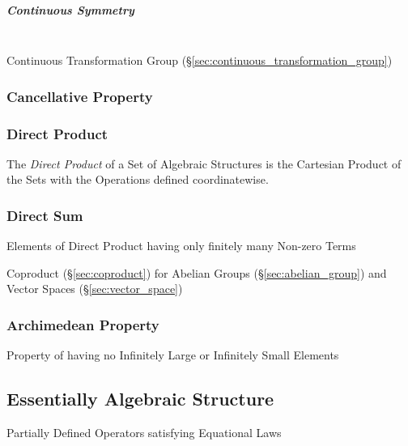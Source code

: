 \subparagraph{Continuous Symmetry}\label{sec:continuous_symmetry}
\hfill \\

Continuous Transformation Group
(\S\ref{sec:continuous_transformation_group})



\subsubsection{Cancellative Property}\label{sec:cancellative_property}

\subsubsection{Direct Product}\label{sec:direct_product}

The \emph{Direct Product} of a Set of Algebraic Structures is the
Cartesian Product of the Sets with the Operations defined
coordinatewise.



\subsubsection{Direct Sum}\label{sec:direct_sum}

Elements of Direct Product having only finitely many Non-zero Terms

Coproduct (\S\ref{sec:coproduct}) for Abelian Groups
(\S\ref{sec:abelian_group}) and Vector Spaces
(\S\ref{sec:vector_space})



\subsubsection{Archimedean Property}\label{sec:archimedean_property}

Property of having no Infinitely Large or Infinitely Small Elements



\subsection{Essentially Algebraic Structure}
\label{sec:essentially_algebraic}

Partially Defined Operators satisfying Equational Laws



